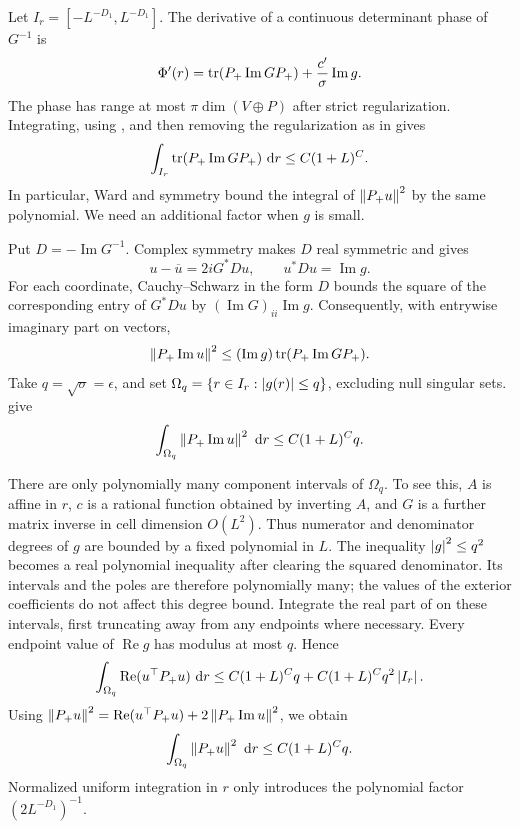 Let $I_r=[-L^{-D_1},L^{-D_1}]$. The derivative of a continuous
determinant phase of $G^{-1}$ is
\[
 \Phi'(r)=\operatorname{tr}(P_+\operatorname{Im}G P_+)
       +\frac{c'}{\sigma}\operatorname{Im}g.
\]
The phase has range at most $\pi\dim(V\oplus P)$ after strict
regularization. Integrating, using , and then
removing the regularization as in  gives
\begin{equation}
 \int_{I_r}\operatorname{tr}(P_+\operatorname{Im}G P_+)\,\,\mathrm d r
 \le C(1+L)^C.
 \label{trans:phase-trace}
\end{equation}
In particular, Ward and symmetry bound the integral of
$\left\lVert P_+u\right\rVert^2$ by the same polynomial. We need an additional factor
when $g$ is small.

Put $D=-\operatorname{Im}G^{-1}$. Complex symmetry makes $D$ real
symmetric and gives
\[
 u-\overline u=2iG^*Du,\qquad
 u^*Du=\operatorname{Im}g.
\]
For each coordinate, Cauchy--Schwarz in the form $D$ bounds the square
of the corresponding entry of $G^*Du$ by
$(\operatorname{Im}G)_{ii}\operatorname{Im}g$. Consequently, with
entrywise imaginary part on vectors,
\begin{equation}
 \left\lVert P_+\operatorname{Im}u\right\rVert^2
 \le (\operatorname{Im}g)
       \operatorname{tr}(P_+\operatorname{Im}G P_+).
 \label{trans:imaginary-vector}
\end{equation}
Take $q=\sqrt\sigma=\epsilon$, and set
$\Omega_q=\{r\in I_r:\left\lvert g(r)\right\rvert\le q\}$, excluding null singular
sets.  give
\[
 \int_{\Omega_q}\left\lVert P_+\operatorname{Im}u\right\rVert^2\,\,\mathrm d r
 \le C(1+L)^Cq.
\]

There are only polynomially many component intervals of $\Omega_q$.
To see this, $A$ is affine in $r$, $c$ is a rational function obtained
by inverting $A$, and $G$ is a further matrix inverse in cell dimension
$O(L^2)$. Thus numerator and denominator degrees of $g$ are bounded
by a fixed polynomial in $L$. The inequality $\left\lvert g\right\rvert^2\le q^2$
becomes a real polynomial inequality after clearing the squared
denominator. Its intervals and the poles are therefore polynomially
many; the values of the exterior coefficients do not affect this
degree bound. Integrate the real part of
 on these intervals, first truncating
away from any endpoints where necessary. Every endpoint value of
$\operatorname{Re}g$ has modulus at most $q$. Hence
\[
 \int_{\Omega_q}\operatorname{Re}(u^\top P_+u)\,\,\mathrm d r
 \le C(1+L)^Cq+C(1+L)^Cq^2\left\lvert I_r\right\rvert.
\]
Using
$\left\lVert P_+u\right\rVert^2=\operatorname{Re}(u^\top P_+u)
 +2\left\lVert P_+\operatorname{Im}u\right\rVert^2$, we obtain
\begin{equation}
 \int_{\Omega_q}\left\lVert P_+u\right\rVert^2\,\,\mathrm d r
 \le C(1+L)^Cq.
 \label{trans:small-response}
\end{equation}
Normalized uniform integration in $r$ only introduces the polynomial
factor $(2L^{-D_1})^{-1}$.

